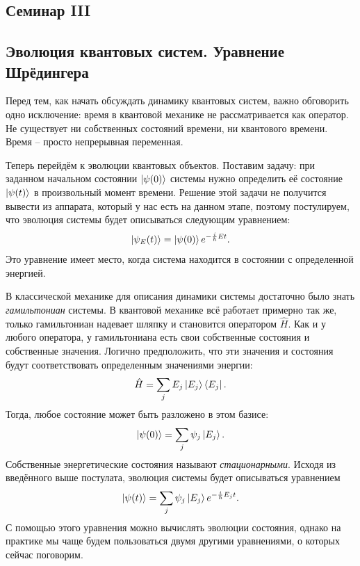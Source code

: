 \begin{center}
    \section{Семинар III}
\end{center}
\subsection{Эволюция квантовых систем. Уравнение Шрёдингера}
Перед тем, как начать обсуждать динамику квантовых систем, важно обговорить одно исключение: время в квантовой механике не рассматривается как оператор. Не существует ни собственных состояний времени, ни квантового времени. Время – просто непрерывная переменная.

Теперь перейдём к эволюции квантовых объектов. Поставим задачу: при заданном начальном состоянии $\ket{\psi(0)}$ системы нужно определить её состояние $\ket{\psi(t)}$ в произвольный момент времени. Решение этой задачи не получится вывести из аппарата, который у нас есть на данном этапе, поэтому постулируем, что эволюция системы будет описываться следующим уравнением:
\[
\ket{\psi_E(t)} = \ket{\psi(0)} e^{-\frac{i}{\hbar} E t}.
\]
Это уравнение имеет место, когда система находится в состоянии с определенной энергией.

В классической механике для описания динамики системы достаточно было знать \textit{гамильтониан} системы. В квантовой механике всё работает примерно так же, только гамильтониан надевает шляпку и становится оператором $\hat{H}$. Как и у любого оператора, у гамильтониана есть свои собственные состояния и собственные значения. Логично предположить, что эти значения и состояния будут соответствовать определенным значениями энергии:
\[
\hat{H} = \sum_j E_j \ket{E_j} \bra{E_j}.
\]
Тогда, любое состояние может быть разложено в этом базисе:
\[
\ket{\psi(0)} = \sum_j \psi_j \ket{E_j}.
\]
Собственные энергетические состояния называют \textit{стационарными}. Исходя из введённого выше постулата, эволюция системы будет описываться уравнением
\[
\ket{\psi(t)} = \sum_j \psi_j \ket{E_j} e^{-\frac{i}{\hbar} E_j t}.
\]
С помощью этого уравнения можно вычислять эволюции состояния, однако на практике мы чаще будем пользоваться двумя другими уравнениями, о которых сейчас поговорим.

